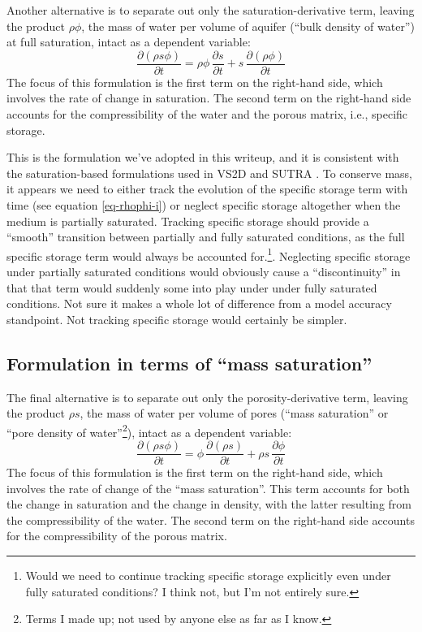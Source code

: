 \documentclass[fleqn]{article}
\begin{document}
{Another alternative is to separate out only the saturation-derivative term, leaving the product $\rho \phi$, the mass of water per volume of aquifer (``bulk density of water'') at full saturation, intact as a dependent variable:
\begin{equation}
\frac{\partial (\rho s \phi)}{\partial t}
  = \rho \phi\, \frac{\partial s}{\partial t}
  + s\,\frac{\partial (\rho \phi)}{\partial t}
\label{eq-sto-expanded-s}
\end{equation}
The focus of this formulation is the first term on the right-hand side, which involves the rate of change in saturation. The second term on the right-hand side accounts for the compressibility of the water and the porous matrix, i.e., specific storage.

This is the formulation we've adopted in this writeup, and it is consistent with the saturation-based formulations used in VS2D \cite{vs2d} and SUTRA \cite{vosssutra}. To conserve mass, it appears we need to either track the evolution of the specific storage term with time (see equation \ref{eq-rhophi-i}) or neglect specific storage altogether when the medium is partially saturated. Tracking specific storage should provide a ``smooth'' transition between partially and fully saturated conditions, as the full specific storage term would always be accounted for.\footnote{{\color{purple}Would we need to continue tracking specific storage explicitly even under fully saturated conditions? I think not, but I'm not entirely sure.}}.  Neglecting specific storage under partially saturated conditions would obviously cause a ``discontinuity'' in that that term would suddenly some into play under under fully saturated conditions. Not sure it makes a whole lot of difference from a model accuracy standpoint. Not tracking specific storage would certainly be simpler.

\subsection{Formulation in terms of ``mass saturation''}

The final alternative is to separate out only the porosity-derivative term, leaving the product $\rho s$, the mass of water per volume of pores (``mass saturation'' or ``pore density of water''\footnote{{\color{purple}Terms I made up; not used by anyone else as far as I know.}}), intact as a dependent variable:
\begin{equation}
\frac{\partial (\rho s \phi)}{\partial t}
  = \phi\,\frac{\partial (\rho s)}{\partial t}
  + \rho s\,\frac{\partial \phi}{\partial t}
\label{eq-sto-expanded-phi}
\end{equation}
The focus of this formulation is the first term on the right-hand side, which involves the rate of change of the ``mass saturation''. This term accounts for both the change in saturation and the change in density, with the latter resulting from the compressibility of the water. The second term on the right-hand side accounts for the compressibility of the porous matrix.

}
\end{document}
